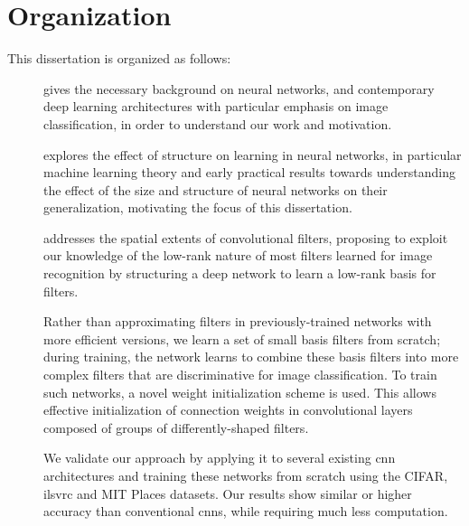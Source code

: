 \documentclass[thesis]{subfiles}
\begin{document}
\section{Organization}
This dissertation is organized as follows:
\begin{description}
	\item[] gives the necessary background on neural networks, and contemporary deep learning architectures
	with particular emphasis on image classification, in order to understand our work and motivation.
	
	\item[] explores the effect of structure on learning in neural networks, in particular machine learning theory and early practical results towards understanding the effect of the size and structure of neural networks on their generalization, motivating the focus of this dissertation.
	
	\item[] addresses the spatial extents of convolutional filters, proposing to exploit our knowledge of the low-rank nature of most filters learned for image recognition by structuring a deep network to learn a low-rank basis for filters.
	
	Rather than approximating filters in previously-trained networks with more efficient versions, we learn a set of small basis filters from scratch; during training, the network learns to combine these basis filters into more complex filters that are discriminative for image classification. To train such networks, a novel weight initialization scheme is used. This allows effective initialization of connection weights in convolutional layers composed of groups of differently-shaped filters. 
	
	We validate our approach by applying it to several existing \gls{cnn} architectures and training these networks from scratch using the CIFAR, \gls{ilsvrc} and MIT Places datasets. Our results show similar or higher accuracy than conventional \glspl{cnn}, while requiring much less computation. %
	

\end{description}
\end{document}

